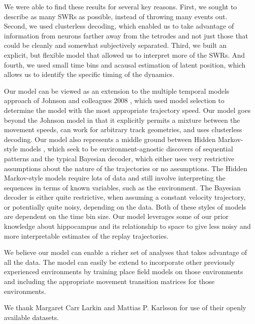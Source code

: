 \documentclass[times, twoside]{zHenriquesLab-StyleBioRxiv}
\begin{document}
We were able to find these results for several key reasons. First, we sought to describe as many SWRs as possible, instead of throwing many events out. Second, we used clusterless decoding, which enabled us to take advantage of information from neurons farther away from the tetrodes and not just those that could be cleanly and somewhat subjectively separated. Third, we built an explicit, but flexible model that allowed us to interpret more of the SWRs. And fourth, we used small time bins and acausal estimation of latent position, which allows us to identify the specific timing of the dynamics.

Our model can be viewed as an extension to the multiple temporal models approach of Johnson and colleagues 2008 \cite{JohnsonMeasuringdistributedproperties2008}, which used model selection to determine the model with the most appropriate trajectory speed. Our model goes beyond the Johnson model in that it explicitly permits a mixture between the movement speeds, can work for arbitrary track geometries, and uses clusterless decoding. Our model also represents a middle ground between Hidden Markov-style models \cite{MaboudiUncoveringtemporalstructure2018, ChenBayesiannonparametricmethods2016, LindermanBayesiannonparametricapproach2016, ChenUncoveringspatialtopology2012}, which seek to be environment-agnostic discovers of sequential patterns and the typical Bayesian decoder, which either uses very restrictive assumptions about the nature of the trajectories or no assumptions. The Hidden Markov-style models require lots of data and still involve interpreting the sequences in terms of known variables, such as the environment. The Bayesian decoder is either quite restrictive, when assuming a constant velocity trajectory, or potentially quite noisy, depending on the data. Both of these styles of models are dependent on the time bin size. Our model leverages some of our prior knowledge about hippocampus and its relationship to space to give less noisy and more interpretable estimates of the replay trajectories.

We believe our model can enable a richer set of analyses that takes advantage of all the data. The model can easily be extend to incorporate other previously experienced environments by training place field models on those environments and including the appropriate movement transition matrices for those environments.

\begin{acknowledgements}
We thank Margaret Carr Larkin and Mattias P. Karlsson for use of their openly available datasets.
\end{acknowledgements}
\end{document}
